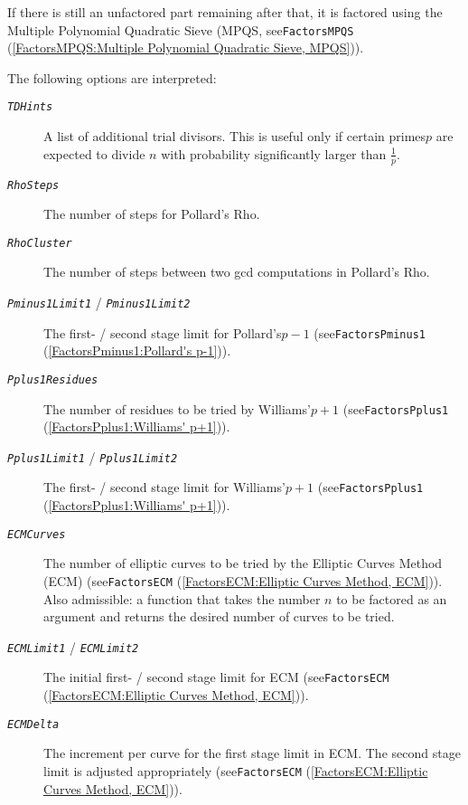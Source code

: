 \documentclass[a4paper,11pt]{report}
\begin{document}
{{{ If there is still an unfactored part remaining after that, it is factored
using the Multiple Polynomial Quadratic Sieve (MPQS, see{\nobreakspace}\texttt{FactorsMPQS} (\ref{FactorsMPQS:Multiple Polynomial Quadratic Sieve, MPQS})). 

 The following options are interpreted: 
\begin{description}
\item[{\mbox{\texttt{\slshape TDHints}}}]  A list of additional trial divisors. This is useful only if certain
primes{\nobreakspace}$p$ are expected to divide $n$ with probability significantly larger than $\frac{1}{p}$. 
\item[{\mbox{\texttt{\slshape RhoSteps}}}]  The number of steps for Pollard's Rho. 
\item[{\mbox{\texttt{\slshape RhoCluster}}}]  The number of steps between two gcd computations in Pollard's Rho. 
\item[{\mbox{\texttt{\slshape Pminus1Limit1}} / \mbox{\texttt{\slshape Pminus1Limit2}}}]  The first- / second stage limit for Pollard's{\nobreakspace}$p-1$ (see{\nobreakspace}\texttt{FactorsPminus1} (\ref{FactorsPminus1:Pollard's p-1})). 
\item[{\mbox{\texttt{\slshape Pplus1Residues}}}]  The number of residues to be tried by Williams'{\nobreakspace}$p+1$ (see{\nobreakspace}\texttt{FactorsPplus1} (\ref{FactorsPplus1:Williams' p+1})). 
\item[{\mbox{\texttt{\slshape Pplus1Limit1}} / \mbox{\texttt{\slshape Pplus1Limit2}}}]  The first- / second stage limit for Williams'{\nobreakspace}$p+1$ (see{\nobreakspace}\texttt{FactorsPplus1} (\ref{FactorsPplus1:Williams' p+1})). 
\item[{\mbox{\texttt{\slshape ECMCurves}}}]  The number of elliptic curves to be tried by the Elliptic Curves Method (ECM)
(see{\nobreakspace}\texttt{FactorsECM} (\ref{FactorsECM:Elliptic Curves Method, ECM})). Also admissible: a function that takes the number $n$ to be factored as an argument and returns the desired number of curves to be
tried. 
\item[{\mbox{\texttt{\slshape ECMLimit1}} / \mbox{\texttt{\slshape ECMLimit2}}}]  The initial first- / second stage limit for ECM (see{\nobreakspace}\texttt{FactorsECM} (\ref{FactorsECM:Elliptic Curves Method, ECM})). 
\item[{\mbox{\texttt{\slshape ECMDelta}}}]  The increment per curve for the first stage limit in ECM. The second stage
limit is adjusted appropriately (see{\nobreakspace}\texttt{FactorsECM} (\ref{FactorsECM:Elliptic Curves Method, ECM})). 

\end{description}}}}
\end{document}
